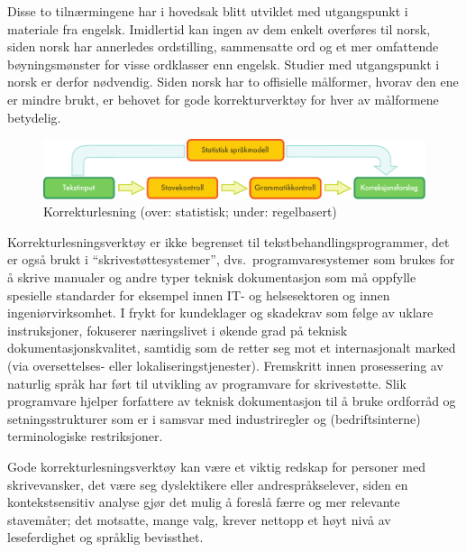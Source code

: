 \begin{multicols}{2}
Disse to tilnærmingene har i hovedsak blitt utviklet med utgangspunkt i materiale fra engelsk. Imidlertid kan ingen av dem enkelt overføres til norsk, siden norsk har annerledes ordstilling, sammensatte ord og et mer omfattende bøyningsmønster for visse ordklasser enn engelsk. Studier med utgangspunkt i norsk er derfor nødvendig. Siden norsk har to offisielle målformer, hvorav den ene er mindre brukt, er behovet for gode korrekturverktøy for hver av målformene betydelig.

\begin{figure}[htb]
  \center
  \includegraphics[width=\textwidth]{../_media/norwegian-bokmaal/language_checking}
  \caption{Korrekturlesning (over: statistisk; under: regelbasert)}
  \label{fig:langcheckingaarch_no}
\end{figure}

Korrekturlesningsverktøy er ikke begrenset til tekstbehandlingsprogrammer, det er også brukt i  “skrivestøttesystemer”, dvs.~programvaresystemer som brukes for å skrive manualer og andre typer teknisk dokumentasjon som må oppfylle spesielle standarder for eksempel innen IT- og helsesektoren og innen ingeniørvirksomhet. I frykt for kundeklager og skadekrav som følge av uklare instruksjoner, fokuserer næringslivet i økende grad på teknisk dokumentasjonskvalitet, samtidig som de retter seg mot et internasjonalt marked (via oversettelses- eller lokaliseringstjenester). Fremskritt innen prosessering av naturlig språk har ført til utvikling av programvare for skrivestøtte. Slik programvare hjelper forfattere av teknisk dokumentasjon til å bruke ordforråd og setningsstrukturer som er i samsvar med industriregler og (bedriftsinterne) terminologiske restriksjoner.


Gode korrekturlesningsverktøy kan være et viktig redskap for personer med skrivevansker, det være seg dyslektikere eller andrespråkselever, siden en kontekstsensitiv analyse gjør det mulig å foreslå færre og mer relevante stavemåter; det motsatte, mange valg, krever nettopp et høyt nivå av leseferdighet og språklig bevissthet.


\end{multicols}
